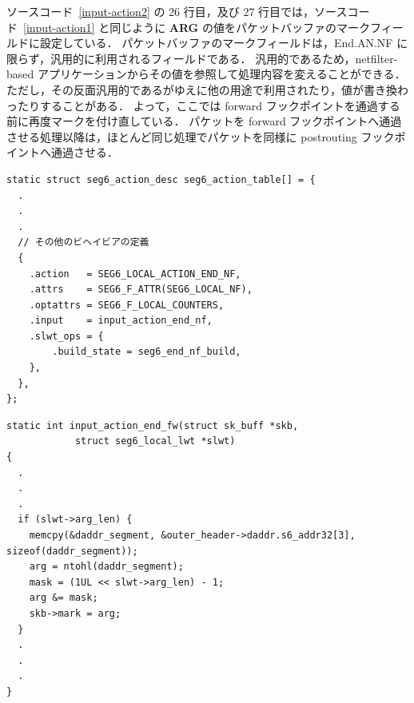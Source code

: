 ソースコード~\ref*{input-action2} の 26 行目，及び 27 行目では，ソースコード~\ref*{input-action1} と同じように \textbf{ARG} の値をパケットバッファのマークフィールドに設定している．
パケットバッファのマークフィールドは，End.AN.NF に限らず，汎用的に利用されるフィールドである．
汎用的であるため，netfilter-based アプリケーションからその値を参照して処理内容を変えることができる．
ただし，その反面汎用的であるがゆえに他の用途で利用されたり，値が書き換わったりすることがある．
よって，ここでは forward フックポイントを通過する前に再度マークを付け直している．
パケットを forward フックポイントへ通過させる処理以降は，ほとんど同じ処理でパケットを同様に postrouting フックポイントへ通過させる．
\newpage

\begin{lstlisting}[caption=Add definition of End.AN.NF to seg6\_action\_table,label=seg6-action-desc]
static struct seg6_action_desc seg6_action_table[] = {
  .
  .
  .
  // その他のビヘイビアの定義
  {
    .action   = SEG6_LOCAL_ACTION_END_NF,
    .attrs    = SEG6_F_ATTR(SEG6_LOCAL_NF),
    .optattrs = SEG6_F_LOCAL_COUNTERS,
    .input    = input_action_end_nf,
    .slwt_ops = {
        .build_state = seg6_end_nf_build,
    },
  },
};
\end{lstlisting}

\begin{lstlisting}[caption=Set a mark to a packet buffer,label=input-action1]
static int input_action_end_fw(struct sk_buff *skb,
  			struct seg6_local_lwt *slwt)
{
  .
  .
  .
  if (slwt->arg_len) {
    memcpy(&daddr_segment, &outer_header->daddr.s6_addr32[3], sizeof(daddr_segment));
    arg = ntohl(daddr_segment);
    mask = (1UL << slwt->arg_len) - 1;
    arg &= mask;
    skb->mark = arg;
  }
  .
  .
  .
}
\end{lstlisting}

